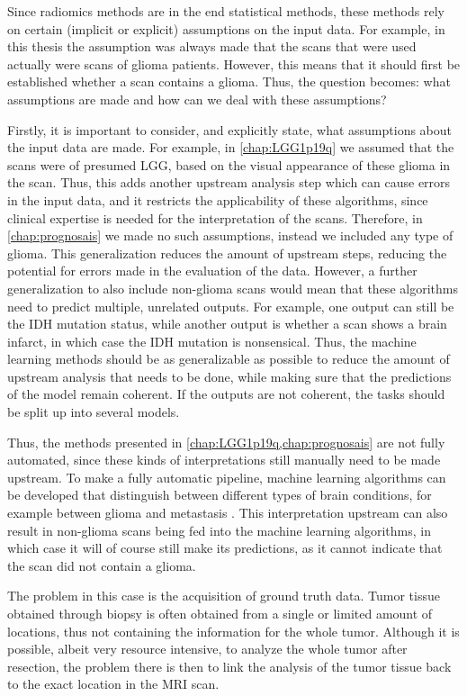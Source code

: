 Since radiomics methods are in the end statistical methods, these methods rely on certain (implicit or explicit) assumptions on the input data.
For example, in this thesis the assumption was always made that the scans that were used actually were scans of glioma patients.
However, this means that it should first be established whether a scan contains a glioma.
Thus, the question becomes: what assumptions are made and how can we deal with these assumptions?

Firstly, it is important to consider, and explicitly state, what assumptions about the input data are made.
For example, in \cref{chap:LGG1p19q} we assumed that the scans were of presumed \gls{LGG}, based on the visual appearance of these glioma in the scan.
Thus, this adds another upstream analysis step which can cause errors in the input data, and it restricts the applicability of these algorithms, since clinical expertise is needed for the interpretation of the scans.
Therefore, in \cref{chap:prognosais} we made no such assumptions, instead we included any type of glioma.
This generalization reduces the amount of upstream steps, reducing the potential for errors made in the evaluation of the data.
However, a further generalization to also include non-glioma scans would mean that these algorithms need to predict multiple, unrelated outputs.
For example, one output can still be the \gls{IDH} mutation status, while another output is whether a scan shows a brain infarct, in which case the \gls{IDH} mutation is nonsensical.
Thus, the machine learning methods should be as generalizable as possible to reduce the amount of upstream analysis that needs to be done, while making sure that the predictions of the model remain coherent.
If the outputs are not coherent, the tasks should be split up into several models.


Thus, the methods presented in \cref{chap:LGG1p19q,chap:prognosais} are not fully automated, since these kinds of interpretations still manually need to be made upstream.
To make a fully automatic pipeline, machine learning algorithms can be developed that distinguish between different types of brain conditions, for example between glioma and metastasis \autocite{chen2019metastatic}.
This interpretation upstream can also result in non-glioma scans being fed into the machine learning algorithms, in which case it will of course still make its predictions, as it cannot indicate that the scan did not contain a glioma.

The problem in this case is the acquisition of ground truth data.
Tumor tissue obtained through biopsy is often obtained from a single or limited amount of locations, thus not containing the information for the whole \gls{tumor}.
Although it is possible, albeit very resource intensive, to analyze the whole \gls{tumor} after resection, the problem there is then to link the analysis of the \gls{tumor} tissue back to the exact location in the \gls{MRI} scan.



